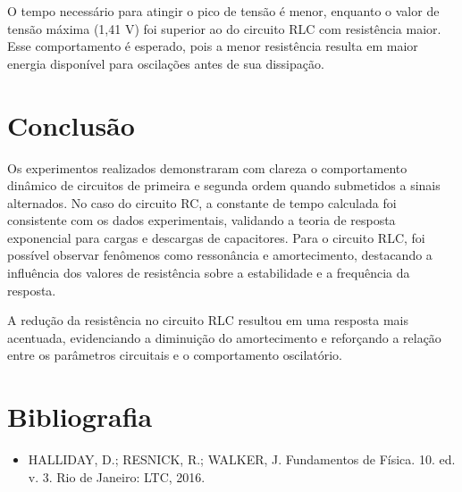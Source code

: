 \documentclass[a4 paper]{article}
\newcommand{\parag}{\hspace{30pt}}
\begin{document}
O tempo necessário para atingir o pico de tensão é menor, enquanto o valor de tensão máxima (1,41 V) foi superior ao do circuito RLC com resistência maior. Esse comportamento é esperado, pois a menor resistência resulta em maior energia disponível para oscilações antes de sua dissipação. 






\newpage
\section{Conclusão}

\parag Os experimentos realizados demonstraram com clareza o comportamento dinâmico de circuitos de primeira e segunda ordem quando submetidos a sinais alternados. No caso do circuito RC, a constante de tempo calculada foi consistente com os dados experimentais, validando a teoria de resposta exponencial para cargas e descargas de capacitores. Para o circuito RLC, foi possível observar fenômenos como ressonância e amortecimento, destacando a influência dos valores de resistência sobre a estabilidade e a frequência da resposta.

A redução da resistência no circuito RLC resultou em uma resposta mais acentuada, evidenciando a diminuição do amortecimento e reforçando a relação entre os parâmetros circuitais e o comportamento oscilatório. 


\vspace{30pt}
\section{Bibliografia}
\begin{itemize}
\item HALLIDAY, D.; RESNICK, R.; WALKER, J. Fundamentos de Física. 10. ed. v. 3. Rio de Janeiro: LTC, 2016.
\end{itemize}
\end{document}
